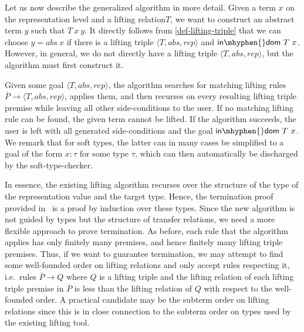 \documentclass{article}
\theoremstyle{definition}
\newcommand{\indom}{\mathsf{in\mhyphen{}dom}}
\newcommand{\liftrel}{lifting relation\xspace}
\newcommand{\liftrels}{lifting relations\xspace}
\begin{document}
Let us now describe the generalized algorithm in more detail.
Given a term \(x\) on the representation level and a \liftrel \(T\),
we want to construct an abstract term \(y\) such that \(T\ x\ y\).
It directly follows from \cref{def-lifting-triple} that we can choose \(y = abs\ x\) if there is a lifting triple \(\langle T, abs, rep\rangle\) and \(\indom\ T\ x\).
However, in general, we do not directly have a lifting triple \(\langle T, abs, rep\rangle\),
but the algorithm must first construct it.

Given some goal \(\langle T, abs, rep\rangle\),
the algorithm searches for matching lifting rules \(\overline{P} \longrightarrow \langle T, abs, rep \rangle\),
applies them, and then recurses on every resulting lifting triple premise
while leaving all other side-conditions to the user.
If no matching lifting rule can be found, the given term cannot be lifted.
If the algorithm succeeds,
the user is left with all generated side-conditions and the goal \(\indom\ T\ x\).
We remark that for soft types,
the latter can in many cases be simplified to a
goal of the form \(x : \tau\) for some type \(\tau\),
which can then automatically be discharged by the soft-type-checker.

In essence,
the existing lifting algorithm recurses over the structure of the type of the
representation value and the target type.
Hence, the termination proof provided in~\cite{huffman2013lifting} is a proof by induction over these types.
Since the new algorithm is not guided by types but the structure of transfer relations,
we need a more flexible approach to prove termination.
As before, each rule that the algorithm applies has only finitely many premises,
and hence finitely many lifting triple premises.
Thus, if we want to guarantee termination,
we may attempt to find some well-founded order on \liftrels and only accept rules respecting it,
i.e.\ rules \(\overline{P} \longrightarrow Q\) where $Q$ is a lifting triple and the \liftrel of each lifting triple premise in \(\overline{P}\) is less than the \liftrel of \(Q\) with respect to the well-founded order.
A practical candidate may be the subterm order on \liftrels
since this is in close connection to the subterm order on types used by the existing lifting tool.
\end{document}
